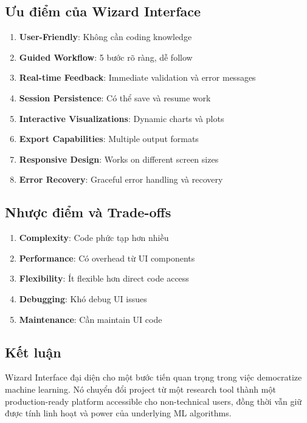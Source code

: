 \subsection{Ưu điểm của Wizard Interface}

\begin{enumerate}
    \item \textbf{User-Friendly}: Không cần coding knowledge
    \item \textbf{Guided Workflow}: 5 bước rõ ràng, dễ follow
    \item \textbf{Real-time Feedback}: Immediate validation và error messages
    \item \textbf{Session Persistence}: Có thể save và resume work
    \item \textbf{Interactive Visualizations}: Dynamic charts và plots
    \item \textbf{Export Capabilities}: Multiple output formats
    \item \textbf{Responsive Design}: Works on different screen sizes
    \item \textbf{Error Recovery}: Graceful error handling và recovery
\end{enumerate}

\subsection{Nhược điểm và Trade-offs}

\begin{enumerate}
    \item \textbf{Complexity}: Code phức tạp hơn nhiều
    \item \textbf{Performance}: Có overhead từ UI components
    \item \textbf{Flexibility}: Ít flexible hơn direct code access
    \item \textbf{Debugging}: Khó debug UI issues
    \item \textbf{Maintenance}: Cần maintain UI code
\end{enumerate}

\subsection{Kết luận}

Wizard Interface đại diện cho một bước tiến quan trọng trong việc democratize machine learning. Nó chuyển đổi project từ một research tool thành một production-ready platform accessible cho non-technical users, đồng thời vẫn giữ được tính linh hoạt và power của underlying ML algorithms.
